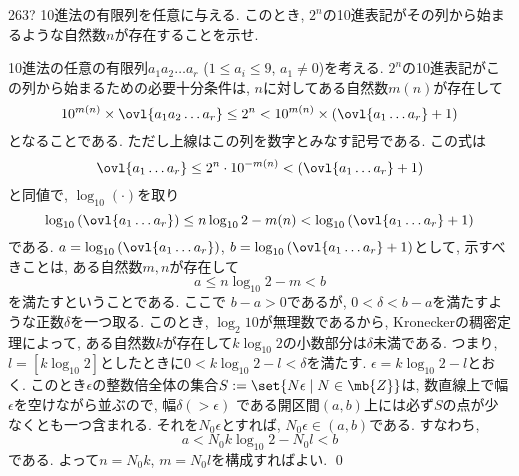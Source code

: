 \begin{thm}{263}{\hosi ?}{}
10進法の有限列を任意に与える. このとき, $2^n$の10進表記がその列から始まるような自然数$n$が存在することを示せ. 
\end{thm}

10進法の任意の有限列$a_1a_2\dots a_r$ ($1\leq a_i \leq 9$, $a_1\neq 0$)を考える. $2^n$の10進表記がこの列から始まるための必要十分条件は, $n$に対してある自然数$m(n)$が存在して
\[10^{m(n)}\times \ovl{a_1a_2\dots a_r} \leq 2^n < 10^{m(n)}\times (\ovl{a_1\dots a_r} + 1)\]
となることである. ただし上線はこの列を数字とみなす記号である. この式は
\[\ovl{a_1\dots a_r} \leq 2^n\cdot 10^{-m(n)} < (\ovl{a_1\dots a_r} + 1)\]
と同値で, $\log_{10}(\cdot )$を取り
\[\log_{10}{(\ovl{a_1\dots a_r})}  \leq n\log_{10}{2}-m(n)  < \log_{10}{(\ovl{a_1\dots a_r} + 1)}\]
である. $a= \log_{10}{(\ovl{a_1\dots a_r})}$, $b= \log_{10}{(\ovl{a_1\dots a_r} + 1)}$として, 示すべきことは, ある自然数$m,n$が存在して
\[a\leq n\log_{10}{2} - m < b\]
を満たすということである. ここで $b-a > 0$であるが, $0 < \delta < b-a$を満たすような正数$\delta$を一つ取る. このとき, $\log_{2}{10}$が無理数であるから, Kroneckerの稠密定理によって, ある自然数$k$が存在して$k\log_{10}{2}$の小数部分は$\delta$未満である. つまり, $l = [k\log_{10}{2}]$としたときに$0<k\log_{10}{2} - l< \delta$を満たす. $\epsilon = k\log_{10}{2} - l$とおく. このとき$\epsilon$の整数倍全体の集合$S:=\set{N\epsilon \mid N\in \mb{Z}}$は, 数直線上で幅$\epsilon$を空けながら並ぶので, 幅$\delta (> \epsilon)$ である開区間$(a,b)$上には必ず$S$の点が少なくとも一つ含まれる. それを$N_0\epsilon$とすれば, $N_0\epsilon \in (a,b)$である. すなわち, 
\[a < N_0k \log_{10}{2} - N_0l < b\]
である. よって$n=N_0k$, $m=N_0l$を構成すればよい. \qed 
